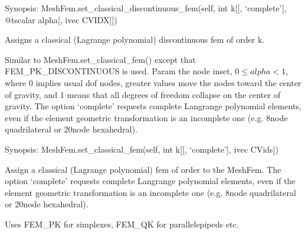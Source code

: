 \documentclass[a4paper,11pt,english]{sphinxmanual}
\begin{document}
\begin{fulllineitems}
\begin{fulllineitems}
\end{fulllineitems}


\begin{fulllineitems}
\label{\detokenize{python/cmdref_MeshFem:getfem.MeshFem.set_classical_discontinuous_fem}}
Synopsis: MeshFem.set\_classical\_discontinuous\_fem(self, int k{[}{[}, ‘complete’{]}, @tscalar alpha{[}, ivec CVIDX{]}{]})

Assigns a classical (Lagrange polynomial) discontinuous fem of order k.

Similar to MeshFem.set\_classical\_fem() except that
FEM\_PK\_DISCONTINUOUS is used. Param  the node inset,
\(0 \leq alpha < 1\), where 0 implies usual dof nodes, greater values
move the nodes toward the center of gravity, and 1 means that all
degrees of freedom collapse on the center of gravity.
The option ‘complete’ requests complete Langrange polynomial elements,
even if the element geometric transformation is an incomplete one
(e.g. 8\sphinxhyphen{}node quadrilateral or 20\sphinxhyphen{}node hexahedral).

\end{fulllineitems}


\begin{fulllineitems}
\label{\detokenize{python/cmdref_MeshFem:getfem.MeshFem.set_classical_fem}}
Synopsis: MeshFem.set\_classical\_fem(self, int k{[}{[}, ‘complete’{]}, ivec CVids{]})

Assign a classical (Lagrange polynomial) fem of order  to the MeshFem.
The option ‘complete’ requests complete Langrange polynomial elements,
even if the element geometric transformation is an incomplete one
(e.g. 8\sphinxhyphen{}node quadrilateral or 20\sphinxhyphen{}node hexahedral).

Uses FEM\_PK for simplexes, FEM\_QK for parallelepipeds etc.

\end{fulllineitems}


\end{fulllineitems}
\end{document}
